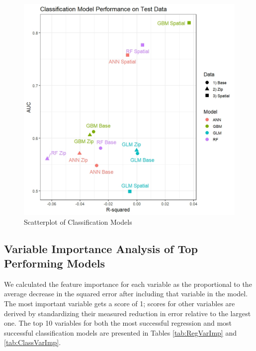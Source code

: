 \documentclass[conference,final,]{IEEEtran}
\makeatletter
\def\maxwidth{\ifdim\Gin@nat@width>\linewidth\linewidth
\else\Gin@nat@width\fi}
\let\Oldincludegraphics\includegraphics
\renewcommand{\includegraphics}[1]{\Oldincludegraphics[width=\maxwidth]{#1}}
\makeatother
\begin{document}
\begin{figure}
\centering
\includegraphics{Sections/tables_and_figures/class_model_results_scatterplot.jpeg}
\caption{\label{fig:Class Models Scatterplot}Scatterplot of
Classification Models}
\end{figure}

\hypertarget{variable-importance-analysis-of-top-performing-models}{%
\subsection{Variable Importance Analysis of Top Performing
Models}\label{variable-importance-analysis-of-top-performing-models}}

We calculated the feature importance for each variable as the
proportional to the average decrease in the squared error after
including that variable in the model. The most important variable gets a
score of 1; scores for other variables are derived by standardizing
their measured reduction in error relative to the largest one. The top
10 variables for both the most successful regression and most successful
classification models are presented in Tables \ref{tab:RegVarImp} and
\ref{tab:ClassVarImp}.
\end{document}
